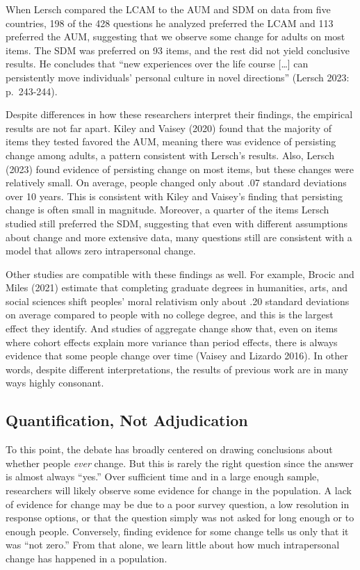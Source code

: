 \documentclass[
  11pt,
]{article}
\begin{document}
When Lersch compared the LCAM to the AUM and SDM on data from five
countries, 198 of the 428 questions he analyzed preferred the LCAM and
113 preferred the AUM, suggesting that we observe some change for adults
on most items. The SDM was preferred on 93 items, and the rest did not
yield conclusive results. He concludes that ``new experiences over the
life course {[}\ldots{]} can persistently move individuals' personal
culture in novel directions'' (Lersch 2023: p.~243-244).

Despite differences in how these researchers interpret their findings,
the empirical results are not far apart. Kiley and Vaisey (2020) found
that the majority of items they tested favored the AUM, meaning there
was evidence of persisting change among adults, a pattern consistent
with Lersch's results. Also, Lersch (2023) found evidence of persisting
change on most items, but these changes were relatively small. On
average, people changed only about .07 standard deviations over 10
years. This is consistent with Kiley and Vaisey's finding that
persisting change is often small in magnitude. Moreover, a quarter of
the items Lersch studied still preferred the SDM, suggesting that even
with different assumptions about change and more extensive data, many
questions still are consistent with a model that allows zero
intrapersonal change.

Other studies are compatible with these findings as well. For example,
Brocic and Miles (2021) estimate that completing graduate degrees in
humanities, arts, and social sciences shift peoples' moral relativism
only about .20 standard deviations on average compared to people with no
college degree, and this is the largest effect they identify. And
studies of aggregate change show that, even on items where cohort
effects explain more variance than period effects, there is always
evidence that some people change over time (Vaisey and Lizardo 2016). In
other words, despite different interpretations, the results of previous
work are in many ways highly consonant.

\subsection{Quantification, Not
Adjudication}\label{quantification-not-adjudication}

To this point, the debate has broadly centered on drawing conclusions
about whether people \emph{ever} change. But this is rarely the right
question since the answer is almost always ``yes.'' Over sufficient time
and in a large enough sample, researchers will likely observe some
evidence for change in the population. A lack of evidence for change may
be due to a poor survey question, a low resolution in response options,
or that the question simply was not asked for long enough or to enough
people. Conversely, finding evidence for some change tells us only that
it was ``not zero.'' From that alone, we learn little about how much
intrapersonal change has happened in a population.
\end{document}

